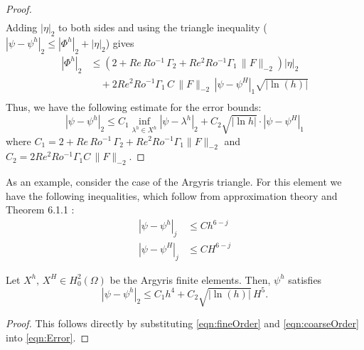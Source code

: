 \begin{proof}
\begin{align*}
  \end{align*}
  Adding $|\eta|_2$ to both sides and using the triangle inequality ($|\psi -
  \psi^h|_2 \le |\Phi^h|_2 + |\eta|_2$) gives
  \begin{align*}
    |\Phi^h|_2 &\le \left(2 + Re\, Ro^{-1}\, \Gamma_2 + Re^2 Ro^{-1} \Gamma_1\,
      \|F\|_{-2}\right) |\eta|_2 \\
    &\quad + 2 Re^2 Ro^{-1} \Gamma_1\, C\, \|F\|_{-2}\, |\psi - \psi^H|_1
      \sqrt{|\ln(h)|} \\
  \end{align*}
  Thus, we have the following estimate for the error bounds:
  \begin{equation*}
    |\psi-\psi^h|_2 \le C_1 \inf_{\lambda^h\in X^h} |\psi-\lambda^h|_2 + C_2
      \sqrt{|\ln h|}\cdot |\psi - \psi^H|_1
  \end{equation*}
  where $C_1 = 2 + Re\,Ro^{-1}\, \Gamma_2 + Re^2 Ro^{-1} \Gamma_1 \|F\|_{-2}$
  and $C_2= 2 Re^2 Ro^{-1} \Gamma_1 C\,\|F\|_{-2}$.
\end{proof}

As an example, consider the case of the Argyris triangle. For this element we
have the following inequalities, which follow from approximation theory
\cite{Bernadou94} and Theorem 6.1.1 \cite{Ciarlet}:
\begin{align}
  |\psi - \psi^h|_j &\le Ch^{6-j} \label{eqn:fineOrder} \\
  |\psi - \psi^H|_j &\le CH^{6-j} \label{eqn:coarseOrder}
\end{align}
\begin{corollary} \label{crl:Argyris2L}
  Let $X^h,\, X^H \in H^2_0(\Omega)$ be the Argyris finite elements. Then,
  $\psi^h$ satisfies
  \begin{equation}
    |\psi - \psi^h|_2 \le C_1 h^4 + C_2 \sqrt{|\ln(h)|}\, H^5.
    \label{eqn:TwoLevelError}
  \end{equation}
\end{corollary}
\begin{proof}
  This follows directly by substituting \eqref{eqn:fineOrder} and
  \eqref{eqn:coarseOrder} into \eqref{eqn:Error}.
\end{proof}
